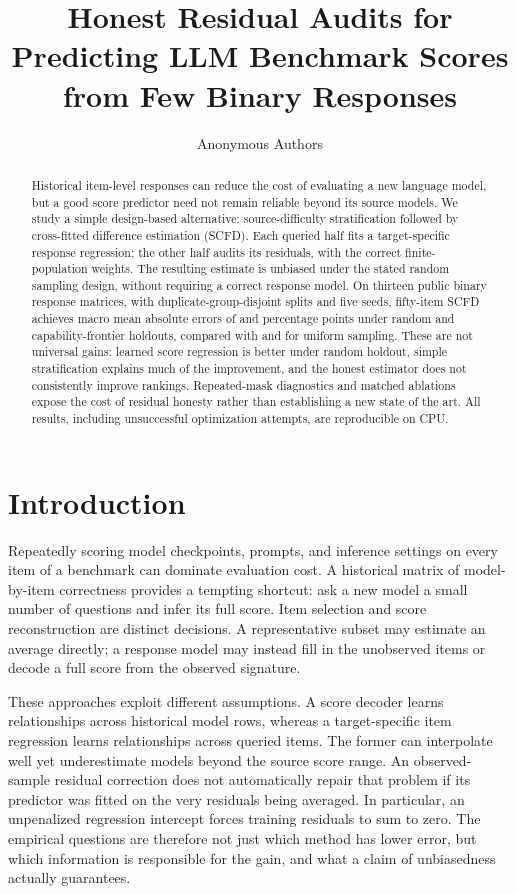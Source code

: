 \documentclass{article}
\title{Honest Residual Audits for Predicting LLM Benchmark Scores\\from Few Binary Responses}
\author{Anonymous Authors}
\begin{document}
\maketitle
\begin{abstract}
Historical item-level responses can reduce the cost of evaluating a new language model, but a good score predictor need not remain reliable beyond its source models. We study a simple design-based alternative: source-difficulty stratification followed by cross-fitted difference estimation (SCFD). Each queried half fits a target-specific response regression; the other half audits its residuals, with the correct finite-population weights. The resulting estimate is unbiased under the stated random sampling design, without requiring a correct response model. On thirteen public binary response matrices, with duplicate-group-disjoint splits and five seeds, fifty-item SCFD achieves macro mean absolute errors of \IIDSCFD{} and \FrontierSCFD{} percentage points under random and capability-frontier holdouts, compared with \IIDUniform{} and \FrontierUniform{} for uniform sampling. These are not universal gains: learned score regression is better under random holdout, simple stratification explains much of the improvement, and the honest estimator does not consistently improve rankings. Repeated-mask diagnostics and matched ablations expose the cost of residual honesty rather than establishing a new state of the art. All results, including unsuccessful optimization attempts, are reproducible on CPU.
\end{abstract}

\section{Introduction}
Repeatedly scoring model checkpoints, prompts, and inference settings on every item of a benchmark can dominate evaluation cost. A historical matrix of model-by-item correctness provides a tempting shortcut: ask a new model a small number of questions and infer its full score. Item selection and score reconstruction are distinct decisions. A representative subset may estimate an average directly; a response model may instead fill in the unobserved items or decode a full score from the observed signature.

These approaches exploit different assumptions. A score decoder learns relationships across historical model rows, whereas a target-specific item regression learns relationships across queried items. The former can interpolate well yet underestimate models beyond the source score range. An observed-sample residual correction does not automatically repair that problem if its predictor was fitted on the very residuals being averaged. In particular, an unpenalized regression intercept forces training residuals to sum to zero. The empirical questions are therefore not just which method has lower error, but which information is responsible for the gain, and what a claim of unbiasedness actually guarantees.
\end{document}
